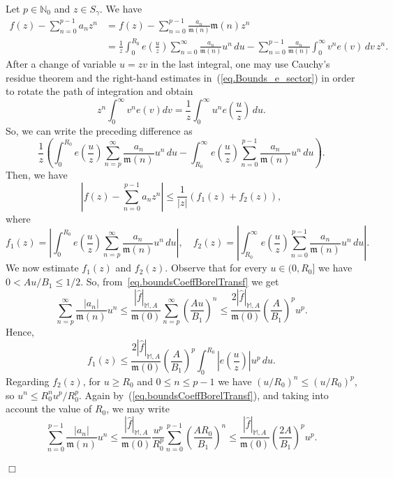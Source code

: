 \documentclass[11pt,a4paper]{article}
\theoremstyle{plain}
\theoremstyle{definition}
\newenvironment{proof1}{\medskip\par\noindent{\bf Proof.}}{\hfill $\Box$
\medskip\par}
\newcommand{\N}{\mathbb{N}}
\newcommand{\M}{\mathbb{M}}
\newcommand{\mo}{\mathfrak{m}}
\def\ga{\gamma}
\begin{document}
\begin{proof1}
Let $p\in\N_0$ and $z\in S_{\ga}$. We have
\begin{align*}
f(z)-\sum_{n=0}^{p-1}a_nz^n &= f(z)-\sum_{n=0}^{p-1}\frac{a_n}{\mo(n)}\mo(n)z^n\\
&= \frac{1}{z}\int_{0}^{R_0}e \left(\frac{u}{z}\right) \sum_{n=0}^{\infty}\frac{a_{n}}{\mo(n)}u^n\,du -\sum_{n=0}^{p-1}\frac{a_n}{\mo(n)}\int_{0}^{\infty}v^{n}e(v)\,dv\, z^n.
\end{align*}
After a change of variable $u=zv$ in the last integral, one may use Cauchy's residue theorem and the right-hand estimates in~(\ref{eq.Bounds_e_sector}) in order to rotate the path of integration and obtain
$$
z^n\int_{0}^{\infty}v^{n}e(v)dv= \frac{1}{z}\int_{0}^{\infty}u^{n}e\left(\frac{u}{z}\right)\,du.
$$
So, we can write the preceding difference as
\begin{equation*}
\frac{1}{z}\left(\int_{0}^{R_0}e\left(\frac{u}{z}\right) \sum_{n=p}^{\infty}\frac{a_{n}}{\mo(n)}u^n\,du -\int_{R_0}^{\infty}e\left(\frac{u}{z}\right) \sum_{n=0}^{p-1}\frac{a_n}{\mo(n)}u^{n}\,du\right).
\end{equation*}
Then, we have
\begin{equation}\label{eq.RemainderTwoSums}
\left|f(z)-\sum_{n=0}^{p-1}a_nz^n\right|\le \frac{1}{|z|}(f_{1}(z)+f_2(z)),
\end{equation}
where
$$
f_{1}(z)=\left|\int_{0}^{R_0}e \left(\frac{u}{z}\right) \sum_{n=p}^{\infty}\frac{a_{n}}{\mo(n)}u^n \,du\right|,\quad
f_{2}(z)=\left|\int_{R_0}^{\infty}e \left(\frac{u}{z}\right) \sum_{n=0}^{p-1}\frac{a_n}{\mo(n)}u^n\,du\right|.$$
We now estimate $f_1(z)$ and $f_2(z)$.
Observe that for every $u\in(0,R_0]$ we have $0<Au/B_1\le 1/2$. So, from~\eqref{eq.boundsCoeffBorelTransf} we get
\begin{equation*}
\sum_{n=p}^{\infty}\frac{|a_{n}|}{\mo(n)}u^n\le \frac{|\widehat{f}|_{\M,A}}{\mo(0)} \sum_{n=p}^{\infty}\left(\frac{Au}{B_1}\right)^n\le
\frac{2|\widehat{f}|_{\M,A}}{\mo(0)}\left(\frac{A}{B_1}\right)^p u^p.
\end{equation*}
Hence,
\begin{equation}\label{eq.Estimates_f1}
f_{1}(z)\le \frac{2|\widehat{f}|_{\M,A}}{\mo(0)} \left(\frac{A}{B_1}\right)^p \int_{0}^{R_0}\left|e\left(\frac{u}{z}\right)\right| u^p\,du.
\end{equation}
Regarding $f_{2}(z)$, for $u\ge R_0$ and $0\le n\le p-1$ we have $(u/R_0)^n\le (u/R_0)^p$, so $u^n\le R_0^nu^p/R_0^p$. Again by~(\ref{eq.boundsCoeffBorelTransf}), and taking into account the value of $R_0$, we may write
$$\sum_{n=0}^{p-1}\frac{|a_n|}{\mo(n)}u^n\le \frac{|\widehat{f}|_{\M,A}}{\mo(0)}\frac{u^p}{R_0^p} \sum_{n=0}^{p-1}\left(\frac{AR_0}{B_1}\right)^n\le \frac{|\widehat{f}|_{\M,A}}{\mo(0)}\left(\frac{2A}{B_1}\right)^p u^p.$$

\end{proof1}
\end{document}
